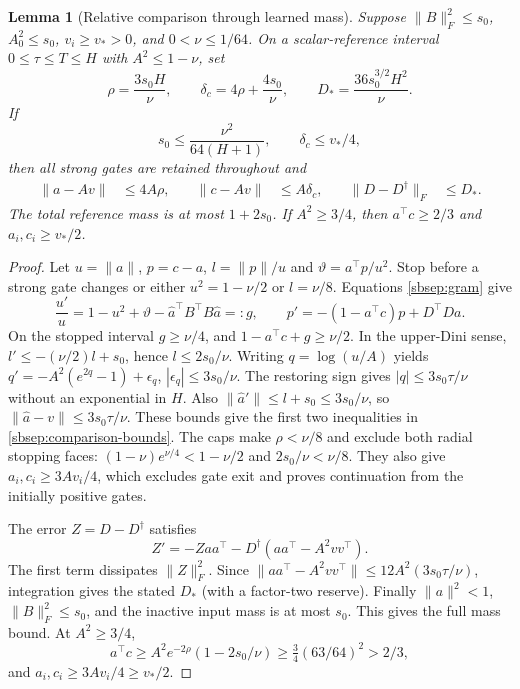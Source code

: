 \documentclass[11pt]{article}
\newtheorem{lemma}[theorem]{Lemma}
\theoremstyle{remark}
\begin{document}
\begin{lemma}[Relative comparison through learned mass]
\label{sbsep:relative-comparison}
Suppose $\|B\|_F^2\le s_0$, $A_0^2\le s_0$, $v_i\ge v_*>0$,
and $0<\nu\le1/64$. On a scalar-reference interval $0\le\tau\le T\le H$
with $A^2\le1-\nu$, set
\[
 \rho=\frac{3s_0H}{\nu},\qquad
 \delta_c=4\rho+\frac{4s_0}{\nu},\qquad
 D_* =\frac{36s_0^{3/2}H^2}{\nu}.
\]
If
\begin{equation}\label{sbsep:comparison-caps}
 s_0\le\frac{\nu^2}{64(H+1)},\qquad \delta_c\le v_*/4,
\end{equation}
then all strong gates are retained throughout and
\begin{align}
 \|a-Av\|&\le4A\rho,&\quad\|c-Av\|&\le A\delta_c,
 &\quad\|D-D^\dagger\|_F&\le D_* .\label{sbsep:comparison-bounds}
\end{align}
The total reference mass is at most $1+2s_0$. If $A^2\ge3/4$, then
$a^\top c\ge2/3$ and $a_i,c_i\ge v_*/2$.
\end{lemma}
\begin{proof}
Let $u=\|a\|$, $p=c-a$, $l=\|p\|/u$ and
$\vartheta=a^\top p/u^2$. Stop before a strong gate changes or either
$u^2=1-\nu/2$ or $l=\nu/8$. Equations \eqref{sbsep:gram} give
\[
 \frac{u'}u=1-u^2+\vartheta-\widehat a^\top B^\top B\widehat a=:g,
 \qquad p'=-(1-a^\top c)p+D^\top Da.
\]
On the stopped interval $g\ge\nu/4$, and
$1-a^\top c+g\ge\nu/2$. In the upper-Dini sense,
$l'\le-(\nu/2)l+s_0$, hence $l\le2s_0/\nu$.
Writing $q=\log(u/A)$ yields
$q'=-A^2(e^{2q}-1)+\epsilon_q$, $|\epsilon_q|\le3s_0/\nu$.
The restoring sign gives $|q|\le3s_0\tau/\nu$ without an exponential
in $H$. Also $\|\widehat a'\|\le l+s_0\le3s_0/\nu$, so
$\|\widehat a-v\|\le3s_0\tau/\nu$.
These bounds give the first two inequalities in
\eqref{sbsep:comparison-bounds}. The caps make
$\rho<\nu/8$ and exclude both radial stopping faces:
$(1-\nu)e^{\nu/4}<1-\nu/2$ and $2s_0/\nu<\nu/8$.
They also give $a_i,c_i\ge3Av_i/4$, which excludes gate exit and
proves continuation from the initially positive gates.

The error $Z=D-D^\dagger$ satisfies
\[
 Z'=-Zaa^\top-D^\dagger(aa^\top-A^2vv^\top).
\]
The first term dissipates $\|Z\|_F^2$.
Since $\|aa^\top-A^2vv^\top\|\le12A^2(3s_0\tau/\nu)$,
integration gives the stated $D_*$ (with a factor-two reserve).
Finally $\|a\|^2<1$, $\|B\|_F^2\le s_0$, and the inactive input
mass is at most $s_0$. This gives the full mass bound. At $A^2\ge3/4$,
\[
 a^\top c\ge A^2e^{-2\rho}(1-2s_0/\nu)
 \ge\tfrac34(63/64)^2>2/3,
\]
and $a_i,c_i\ge3Av_i/4\ge v_*/2$.
\end{proof}
\end{document}
